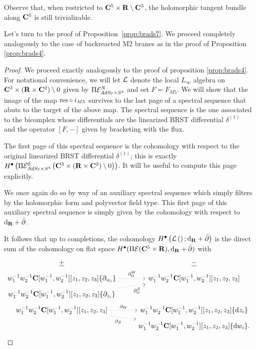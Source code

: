 \documentclass[../main.tex]{subfiles}
\begin{document}
Observe that, when restricted to $\mathbf{C}^5 \times \mathbf{R} \setminus \mathbf{C}^3$, the holomorphic tangent bundle along $\mathbf{C}^5$ is still trivializable. 

\parsec[]

Let's turn to the proof of Proposition~\ref{prop:brads7}.
We proceed completely analogously to the case of backreacted M2 branes as in the proof of Proposition \ref{prop:brads4}. 
\fi

\begin{proof}
We proceed exactly analogously to the proof of proposition \ref{prop:brads4}. For notational convenience, we will let $\mathcal{L}$ denote the local $L_\infty$ algebra on  $\mathbf{C}^3\times (\mathbf{R}\times \mathbf{C}^2)\setminus 0$ given by $\Pi\mathcal{E}^N_{AdS_7\times S^4}$ and set $F = F_{M5}$. We will show that the image of the map $\mathrm{res}\circ i_{M5}$ survives to the last page of a spectral sequence that abuts to the target of the above map. The spectral sequence is the one associated to the bicomplex whose differentials are the linearized BRST differential $\delta^{(1)}$ and the operator $[F,- ]$ given by bracketing with the flux.

The first page of this spectral sequence is the cohomology with respect to the original linearized BRST differential $\delta^{(1)}$; this is exactly $H^\bullet \left ( \Pi \mathcal{E}^0 _{AdS_7\times S^4} \left ( \mathbf{C}^3\times (\mathbf{R}\times \mathbf{C}^2)\setminus 0\right )\right )$. It will be useful to compute this page explicitly.

We once again do so by way of an auxiliary spectral sequence which simply filters by the holomorphic form and polyvector field type. 
This first page of this auxiliary spectral sequence is simply given by the cohomology with respect to $\mathrm{d}_{\mathbf{R}}+\bar{\partial}$. 

It follows that up to completions, the cohomology $H^\bullet \left ( \mathcal{L}\left ( \right ) ; \mathrm{d}_{\mathbf{R}} +\bar{\partial}\right )$  is the direct sum of the cohomology on flat space $H^\bullet(\Pi \mathcal{E}(\mathbf{C}^5 \times \mathbf{R}), \mathrm{d}_{\mathbf{R}}+\bar{\partial})$ with
\begin{equation}
  \label{eqn:ads7ss2} 
  \begin{tikzcd}[row sep = 1 ex]
    \ul{+} & \ul{-} \\ 
w_1^{-1} w_2^{-1} \C[w_1^{-1}, w_2^{-1}][z_1,z_2,z_3] \{\partial_{w_i}\}  \ar[r, dotted, "\div^W"] & w_1^{-1} w_2^{-1} \C[w_1^{-1}, w_2^{-1}] [z_1,z_2,z_3] \\
w_1^{-1} w_2^{-1} \C[w_1^{-1}, w_2^{-1}] [z_1,z_2,z_3] \{\del_{z_i}\} \ar[ur, dotted, "\div^Z"'] \\
w_1^{-1} w_2^{-1} \C[w_1^{-1}, w_2^{-1}] [z_1,z_2,z_3] \ar[r, dotted, "\del_W"] \ar[dr, dotted, "\del_Z"'] & w_1^{-1} w_2^{-1} \C[w_1^{-1}, w_2^{-1}][z_1,z_2,z_3] \{\d z_i\} \\ & w_1^{-1} w_2^{-1} \C[w_1^{-1}, w_2^{-1}][z_1,z_2,z_3] \{\d w_i\} .
\end{tikzcd}
\end{equation}


\end{proof}
\end{document}
